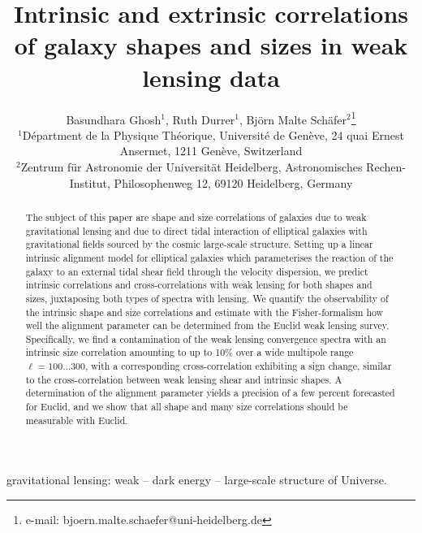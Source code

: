 \documentclass[a4paper,fleqn,usenatbib]{mnras}
\title[Intrinsic sizes and shapes of galaxies]
{Intrinsic and extrinsic correlations of galaxy shapes and sizes in weak lensing data}
\author[B. Ghosh, R. Durrer, B.M. Sch{\"a}fer]
{Basundhara Ghosh$^1$, Ruth Durrer$^1$, Bj{\"o}rn Malte Sch{\"a}fer$^2$\thanks{e-mail: bjoern.malte.schaefer@uni-heidelberg.de}\\
$^1$D{\'e}partment de la Physique Th{\'e}orique, Universit{\'e} de Gen{\`e}ve, 24 quai Ernest Ansermet, 1211 Gen{\`e}ve, Switzerland\\
$^2$Zentrum f{\"u}r Astronomie der Universit{\"a}t Heidelberg, Astronomisches Rechen-Institut, Philosophenweg 12, 69120 Heidelberg, Germany
}
\begin{document}
\pagerange{\pageref{firstpage}--\pageref{lastpage}}
\maketitle
\label{firstpage}


\begin{abstract}
The subject of this paper are shape and size correlations of galaxies due to weak gravitational lensing and due to direct tidal interaction of elliptical galaxies with gravitational fields sourced by the cosmic large-scale structure. Setting up a linear intrinsic alignment model for elliptical galaxies which parameterises the reaction of the galaxy to an external tidal shear field through the velocity dispersion, we predict intrinsic correlations and cross-correlations with weak lensing for both shapes and sizes, juxtaposing both types of spectra with lensing. We quantify the observability of the intrinsic shape and size correlations and estimate with the Fisher-formalism how well the alignment parameter can be determined from the Euclid weak lensing survey. Specifically, we find a contamination of the weak lensing convergence spectra with an intrinsic size correlation amounting to up to 10\%  over a wide multipole range $\ell=100\ldots300$, with a corresponding cross-correlation exhibiting a sign change, similar to the cross-correlation between weak lensing shear and intrinsic shapes. A determination of the alignment parameter yields a precision of a few percent forecasted for Euclid, and we show that all shape and many size correlations should be measurable with Euclid. 
\end{abstract}


\begin{keywords}
gravitational lensing: weak -- dark energy -- large-scale structure of Universe.
\end{keywords}


\end{document}
